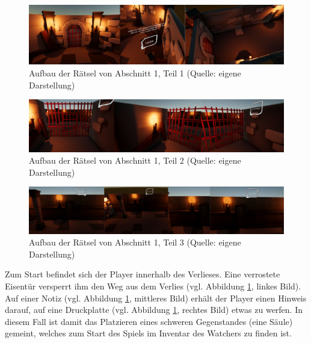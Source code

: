 \begin{figure}[ht]
\centering
\includegraphics[width=1\linewidth]{content/pictures/Rätseldesign - Abschnitt00 - Rätsel00.png}
\caption{Aufbau der Rätsel von Abschnitt 1, Teil 1 (Quelle: eigene Darstellung)}
\label{fig:riddle-design-section00-00}
\end{figure}

\begin{figure}[ht]
\centering
\includegraphics[width=1\linewidth]{content/pictures/Rätseldesign - Abschnitt00 - Rätsel01.png}
\caption{Aufbau der Rätsel von Abschnitt 1, Teil 2 (Quelle: eigene Darstellung)}
\label{fig:riddle-design-section00-01}
\end{figure}

\begin{figure}[ht]
\centering
\includegraphics[width=1\linewidth]{content/pictures/Rätseldesign - Abschnitt00 - Rätsel02.png}
\caption{Aufbau der Rätsel von Abschnitt 1, Teil 3 (Quelle: eigene Darstellung)}
\label{fig:riddle-design-section00-02}
\end{figure}

Zum Start befindet sich der Player innerhalb des Verlieses. Eine verrostete Eisentür versperrt ihm den Weg aus dem Verlies (vgl. Abbildung \ref{fig:riddle-design-section00-00}, linkes Bild). Auf einer Notiz (vgl. Abbildung \ref{fig:riddle-design-section00-00}, mittleres Bild) erhält der Player einen Hinweis darauf, auf eine Druckplatte (vgl. Abbildung \ref{fig:riddle-design-section00-00}, rechtes Bild) etwas zu werfen. In diesem Fall ist damit das Platzieren eines schweren Gegenstandes (eine Säule) gemeint, welches zum Start des Spiels im Inventar des Watchers zu finden ist. 

